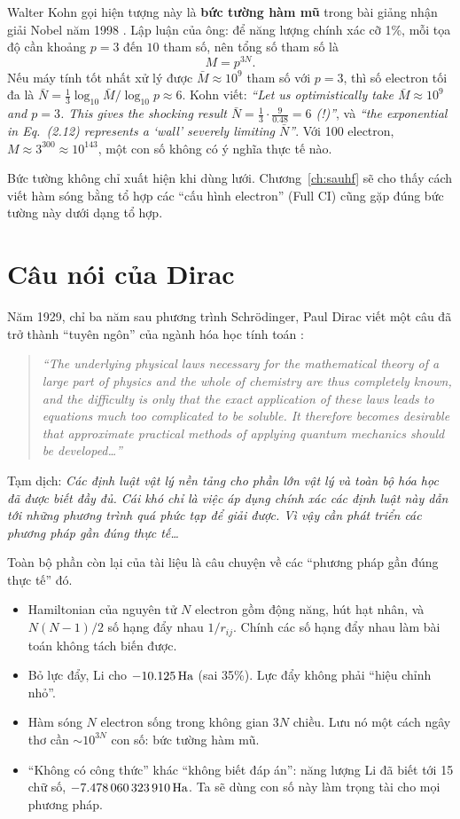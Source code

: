 Walter Kohn gọi hiện tượng này là \textbf{bức tường hàm mũ}  trong bài giảng nhận giải Nobel năm 1998 \cite{Kohn1999}. Lập luận của ông: để năng lượng chính xác cỡ 1\%, mỗi tọa độ cần khoảng $p = 3$ đến $10$ tham số, nên tổng số tham số là
\[
M = p^{3N}.
\]
Nếu máy tính tốt nhất xử lý được $\bar M\approx10^9$ tham số với $p=3$, thì số electron tối đa là $\bar N = \frac13\log_{10}\bar M/\log_{10} p\approx 6$. Kohn viết: \emph{``Let us optimistically take $\bar M\approx10^9$ and $p=3$. This gives the shocking result $\bar N=\frac13\cdot\frac{9}{0.48}=6$ (!)''}, và \emph{``the exponential in Eq.~(2.12) represents a `wall' severely limiting $\bar N$''}. Với 100 electron, $M\approx3^{300}\approx10^{143}$, một con số không có ý nghĩa thực tế nào.

Bức tường không chỉ xuất hiện khi dùng lưới. Chương~\ref{ch:sauhf} sẽ cho thấy cách viết hàm sóng bằng tổ hợp các ``cấu hình electron'' (Full CI) cũng gặp đúng bức tường này dưới dạng tổ hợp.

\section{Câu nói của Dirac}

Năm 1929, chỉ ba năm sau phương trình Schrödinger, Paul Dirac viết một câu đã trở thành ``tuyên ngôn'' của ngành hóa học tính toán \cite{Dirac1929}:

\begin{quote}
\itshape ``The underlying physical laws necessary for the mathematical theory of a large part of physics and the whole of chemistry are thus completely known, and the difficulty is only that the exact application of these laws leads to equations much too complicated to be soluble. It therefore becomes desirable that approximate practical methods of applying quantum mechanics should be developed\ldots''
\end{quote}
Tạm dịch: \emph{Các định luật vật lý nền tảng cho phần lớn vật lý và toàn bộ hóa học đã được biết đầy đủ. Cái khó chỉ là việc áp dụng chính xác các định luật này dẫn tới những phương trình quá phức tạp để giải được. Vì vậy cần phát triển các phương pháp gần đúng thực tế\ldots}

Toàn bộ phần còn lại của tài liệu là câu chuyện về các ``phương pháp gần đúng thực tế'' đó.

\begin{ghinho}
\begin{itemize}
\item Hamiltonian của nguyên tử $N$ electron gồm động năng, hút hạt nhân, và $N(N-1)/2$ số hạng đẩy nhau $1/r_{ij}$. Chính các số hạng đẩy nhau làm bài toán không tách biến được.
\item Bỏ lực đẩy, Li cho $-10.125\,\mathrm{Ha}$ (sai 35\%). Lực đẩy không phải ``hiệu chỉnh nhỏ''.
\item Hàm sóng $N$ electron sống trong không gian $3N$ chiều. Lưu nó một cách ngây thơ cần $\sim10^{3N}$ con số: bức tường hàm mũ.
\item ``Không có công thức'' khác ``không biết đáp án'': năng lượng Li đã biết tới 15 chữ số, $-7.478\,060\,323\,910\,\mathrm{Ha}$. Ta sẽ dùng con số này làm trọng tài cho mọi phương pháp.
\end{itemize}
\end{ghinho}
